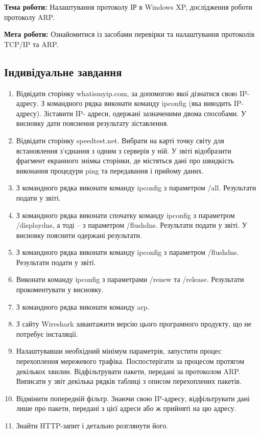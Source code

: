 \documentclass[12pt]{extarticle}
\begin{document}
\textbf{Тема роботи:} Налаштування протоколу ІР в Windows XP, дослідження роботи протоколу
ARP.
\vspace{12pt}

\textbf{Мета роботи:} Ознайомитися із засобами перевірки та налаштування протоколів TCP/IP та
ARP.

\subsection*{Індивідуальне завдання}
\begin{enumerate}
    
\item Відвідати сторінку whatismyip.com, за допомогою якої дізнатися свою IP-адресу. З
командного рядка виконати команду ipconfig (яка виводить IP-адресу). Зіставити IP-
адреси, одержані зазначеними двома способами. У висновку дати пояснення
результату зіставлення.
\item Відвідати сторінку speedtest.net. Вибрати на карті точку світу для встановлення
з’єднання з одним з серверів у ній. У звіті відобразити фрагмент екранного знімка
сторінки, де містяться дані про швидкість виконання процедури ping та передавання і
прийому даних.
\item З командного рядка виконати команду ipconfig з параметром /all. Результати подати у
звіті.
\item З командного рядка виконати спочатку команду ipconfig з параметром /displaydns, а
тоді – з параметром /flushdns. Результати подати у звіті. У висновку пояснити
одержані результати.
\item З командного рядка виконати команду ipconfig з параметром /flushdns. Результати
подати у звіті.
\item Виконати команду ipconfig з параметрами /renew та /release. Результати
прокоментувати у висновку.
\item З командного рядка виконати команду arp.
\item З сайту Wireshark завантажити версію цього програмного продукту, що не потребує
інсталяції.
\item Налаштувавши необхідний мінімум параметрів, запустити процес перехоплення
мережевого трафіка. Поспостерігати за процесом протягом декількох хвилин.
Відфільтрувати пакети, передані за протоколом ARP. Виписати у звіт декілька рядків
таблиці з описом перехоплених пакетів.
\item  Відмінити попередній фільтр. Знаючи свою IP-адресу, відфільтрувати дані лише про
пакети, передані з цієї адреси або ж прийняті на цю адресу.
\item  Знайти HTTP-запит і детально розглянути його.
\end{enumerate}
\end{document}
